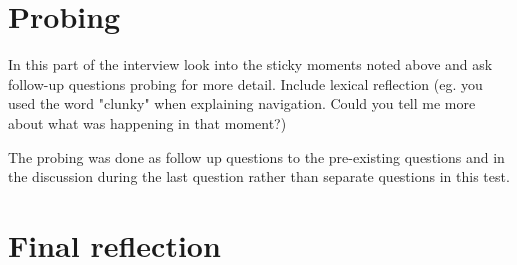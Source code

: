 \section{Probing}
In this part of the interview look into the sticky moments noted above and ask follow-up questions probing for more detail.
Include lexical reflection (eg. you used the word "clunky" when explaining navigation. Could you tell me more about what was happening
in that moment?)

The probing was done as follow up questions to the pre-existing questions and in the discussion during the last question rather than separate questions in this test.



\section{Final reflection}

